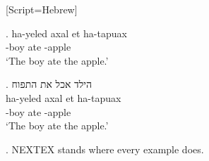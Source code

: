 
\newfontfamily{}[Script=Hebrew]

\ex. 
\gll ha-yeled axal et ha-tapuax \\
     -boy ate  -apple \\
\glt `The boy ate the apple.'

\GlossRTL
\ex. \glll הילד אכל את התפוח \\
           ha-yeled axal et ha-tapuax \\
           -boy ate  -apple \\
\glt `The boy ate the apple.'

\ex. NEXTEX stands where every example does.


